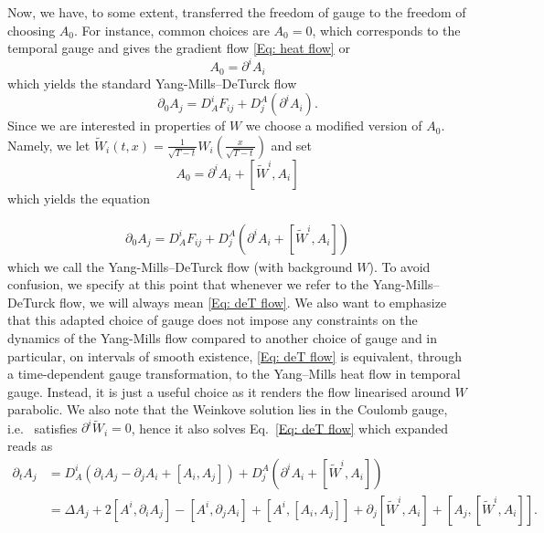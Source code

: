 \documentclass[11pt,reqno]{amsart}
\theoremstyle{remark}
\theoremstyle{definition}
\begin{document}
Now, we have, to some extent, transferred the freedom of gauge to the freedom of choosing $A_0$. For instance, common choices are $A_0=0$, which corresponds to the temporal gauge and gives the gradient flow \eqref{Eq: heat flow} or 
$$
A_0=\partial^i A_i
$$
which yields the standard Yang-Mills--DeTurck flow
\begin{equation}\label{Eq: deT flow2}
    \partial_0 A_j =D^i_A F_{ij} +D_j^A(\partial^i A_i). 
\end{equation}
Since we are interested in properties of $W$ we choose a modified version of $A_0$. Namely, we let $\widetilde W_i(t,x)=\frac{1}{\sqrt{T-t}} W_i(\frac{x}{\sqrt{T-t}})$ and
set
\[
A_0=\partial^iA_i+[\widetilde W^i,A_i]
\]
which yields the equation 

\begin{align}\label{Eq: deT flow}
    \partial_0 A_j=D^i_A F_{ij} +D_j^A(\partial^i A_i +[\widetilde W^i,A_i])
\end{align}
which we call the Yang-Mills--DeTurck flow (with background $W$). To avoid confusion, we specify at this point that whenever we refer to the Yang-Mills--DeTurck flow, we will always mean \eqref{Eq: deT flow}. We also want to emphasize that this adapted choice of gauge does not impose any constraints on the dynamics of the Yang-Mills flow compared to another choice of gauge and in particular, on intervals of smooth existence, \eqref{Eq: deT flow} is equivalent, through a time-dependent gauge transformation, to the Yang–Mills heat flow in temporal gauge. Instead, it is just a useful choice as it renders the flow linearised around $W$ parabolic. 
We  also note that the Weinkove solution lies in the Coulomb gauge, i.e.~ satisfies $\partial^i \widetilde W_i=0$, hence it also solves Eq.~\eqref{Eq: deT flow} which expanded reads as
\begin{align*}
    \partial_t A_j&=D^i_A (\partial_i A_j-\partial_j A_i +[A_i,A_j])+D_j^A( \partial^i A_i+[\widetilde W^i,A_i])
    \\
    &=\Delta A_j+2[A^i, \partial_i A_j]-[A^i, \partial_j A_i]+[A^i,[A_i,A_j]]+\partial_j[\widetilde W^i,A_i]+[A_j,[\widetilde W^i,A_i]].
\end{align*}
\end{document}
